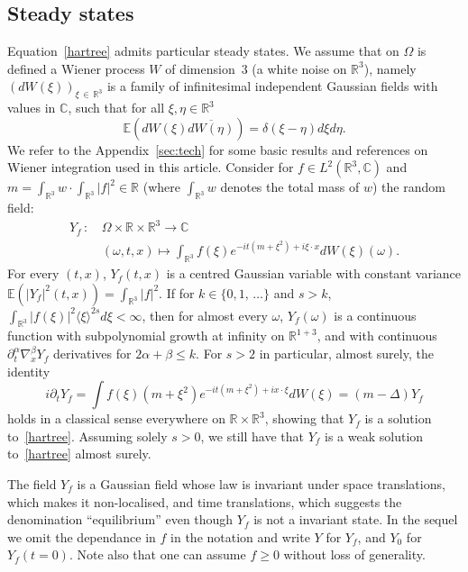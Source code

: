 \documentclass[10pt]{amsart}
\theoremstyle{definition}\newtheorem{defi}[theo]{Definition}\newtheorem{rema}[theo]{Remark}\newtheorem{exam}[theo]{Example}\newtheorem{exem}[theo]{Example}\newtheorem{nota}[theo]{Notation}
\newcommand{\R}{\mathbb{R}}
\newcommand{\C}{\mathbb{C}}
\newcommand{\E}{\mathbb{E}}
\newcommand{\pa}{\partial}
\begin{document}
\subsection{Steady states} 
Equation~\eqref{hartree} admits particular steady states. We assume that on $\Omega$ is defined a Wiener process $W$ of dimension~$3$ (a white noise on $\R^3$), namely $(dW(\xi))_{\xi\,\in\,\R^3}$ is a family of infinitesimal independent Gaussian fields with values in $\C$, such that for all $\xi,\eta \in \R^3$
\[
\E\left(dW(\xi) \overline{dW(\eta)}\right) = \delta (\xi - \eta) d\xi d\eta.
\]
We refer to the Appendix~\ref{sec:tech} for some basic results and references on Wiener integration used in this article. Consider for $f\in L^2(\R^3, \C)$ and $m = \int_{\R^3} w \cdot \int_{\R^3}|f|^2\in \R$ (where $\int_{\R^3} w$ denotes the total mass of $w$) the random field:
\begin{equation}\label{id:Y}
\begin{split}
Y_f\,:\,&\Omega \times \R \times \R^3 \rightarrow \C \\
&(\omega, t, x) \mapsto \int_{\R^3} f(\xi) e^{-it\left(m+\xi^2\right)+i\xi \cdot x} dW(\xi)(\omega).
\end{split}
\end{equation}
For every $(t,x)$, $Y_f(t,x)$ is a centred Gaussian variable with constant variance $\E(|Y_f|^2(t,x))=\int_{\R^3} |f|^2$. If for $k\in \{0,1,\,\dots\}$ and $s>k$, $\int_{\R^3} |f(\xi)|^2\langle \xi\rangle^{2s}d\xi<\infty$, then for almost every $\omega$, $Y_f(\omega)$ is a continuous function with subpolynomial growth at infinity on $\R^{1+3}$, and with continuous $\pa_t^{\alpha}\nabla_x^\beta Y_f$ derivatives for $2\alpha+\beta\leq k$. For $s>2$ in particular, almost surely, the identity
\[
i\partial_t Y_f = \int f(\xi) \left(m+ \xi^2\right) e^{-it\left(m+\xi^2\right) + ix\cdot \xi}dW(\xi) = (m-\Delta) Y_f
\]
holds in a classical sense everywhere on $\R\times \R^3$, showing that $Y_f$ is a solution to~\eqref{hartree}. Assuming solely $s>0$, we still have that $Y_f$ is a weak solution to~\eqref{hartree} almost surely.

The field $Y_f$ is a Gaussian field whose law is invariant under space translations, which makes it non-localised, and time translations, which suggests the denomination ``equilibrium'' even though $Y_f$ is not a invariant state. In the sequel we omit the dependance in $f$ in the notation and write $Y$ for $Y_f$, and $Y_0$ for $Y_f(t=0)$. Note also that one can assume $f\geq 0$ without loss of generality.
\end{document}
